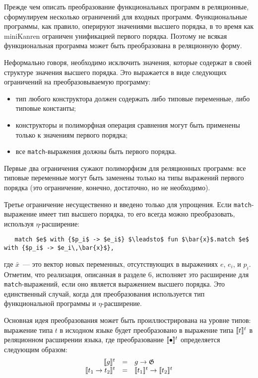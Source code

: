 Прежде чем описать преобразование функциональных программ в реляционные, сформулируем несколько ограничений для входных программ. Функциональные программы, как правило, оперируют значениями высшего порядка, в то время как miniKanren ограничен унификацией первого порядка. Поэтому не всякая функциональная программа может быть преобразована в реляционную форму.

Неформально говоря, необходимо исключить значения, которые содержат в своей структуре значения высшего порядка.
Это выражается в виде следующих ограничений на преобразовываемую программу:

\begin{itemize}
  \item тип любого конструктора должен содержать либо типовые переменные, либо типовые константы;
  \item конструкторы и полиморфная операция сравнения могут быть применены только к значениям первого порядка;
  \item все \lstinline|match|-выражения должны быть первого порядка.
\end{itemize}


Первые два ограничения сужают полиморфизм для реляционных программ: все типовые переменные могут быть заменены только на типы выражений первого порядка (это ограничение, конечно, достаточно, но не необходимо).

Третье ограничение несущественно и введено только для упрощения. Если \lstinline|match|-выражение имеет тип высшего порядка, то его всегда можно преобразовать, используя $\eta$-расширение:

\begin{lstlisting}
   match $e$ with {$p_i$ -> $e_i$} $\leadsto$ fun $\bar{x}$.match $e$ with {$p_i$ -> $e_i\,\bar{x}$},
\end{lstlisting}

\noindent где $\bar{x}$~--- это вектор новых переменных, отсутствующих в выражениях $e$, $e_i$, и $p_i$. Отметим, что реализация, описанная в разделе 6, исполняет это расширение для \lstinline|match|-выражений, если оно является выражением высшего порядка. Это единственный случай, когда для преобразования используется тип функциональной программы и $\eta$-расширение.

Основная идея преобразования может быть проиллюстрирована на уровне типов: выражение типа $t$ в исходном языке будет преобразовано в выражение типа $\llbracket{t}\rrbracket^t$ в реляционном расширении языка, где преобразование $\llbracket{\bullet}\rrbracket^t$ определяется следующим образом:
$$
\begin{array}{rcl}
\llbracket{g}\rrbracket^t                     & = & g \to \mathfrak G \\
\llbracket{t_1 \to t_2}\rrbracket^t           & = & \llbracket{t_1}\rrbracket^t \to \llbracket{t_2}\rrbracket^t \\
\end{array}
$$

